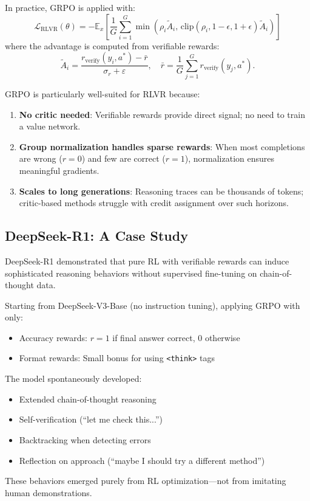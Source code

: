 In practice, GRPO is applied with:
\[
    \mathcal{L}_{\text{RLVR}}(\theta) = -\mathbb{E}_{x} \left[ \frac{1}{G} \sum_{i=1}^{G} \min\left( \rho_i \tilde{A}_i, \, \text{clip}(\rho_i, 1-\epsilon, 1+\epsilon) \tilde{A}_i \right) \right]
\]
where the advantage is computed from verifiable rewards:
\[
    \tilde{A}_i = \frac{r_{\text{verify}}(y_i, a^*) - \bar{r}}{\sigma_r + \varepsilon}, \quad \bar{r} = \frac{1}{G}\sum_{j=1}^G r_{\text{verify}}(y_j, a^*).
\]

\begin{remark}
    GRPO is particularly well-suited for RLVR because:
    \begin{enumerate}
        \item \textbf{No critic needed}: Verifiable rewards provide direct signal; no need to train a value network.
        \item \textbf{Group normalization handles sparse rewards}: When most completions are wrong ($r=0$) and few are correct ($r=1$), normalization ensures meaningful gradients.
        \item \textbf{Scales to long generations}: Reasoning traces can be thousands of tokens; critic-based methods struggle with credit assignment over such horizons.
    \end{enumerate}
\end{remark}

\subsection{DeepSeek-R1: A Case Study}

DeepSeek-R1 demonstrated that pure RL with verifiable rewards can induce sophisticated reasoning behaviors without supervised fine-tuning on chain-of-thought data.

\begin{example}
    Starting from DeepSeek-V3-Base (no instruction tuning), applying GRPO with only:
    \begin{itemize}
        \item Accuracy rewards: $r = 1$ if final answer correct, $0$ otherwise
        \item Format rewards: Small bonus for using \texttt{<think>} tags
    \end{itemize}
    The model spontaneously developed:
    \begin{itemize}
        \item Extended chain-of-thought reasoning
        \item Self-verification (``let me check this...'')
        \item Backtracking when detecting errors
        \item Reflection on approach (``maybe I should try a different method'')
    \end{itemize}
    These behaviors emerged purely from RL optimization---not from imitating human demonstrations.
\end{example}

